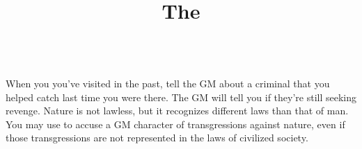 \documentclass[darkmode]{dw_playbook}
\title{The \playbook}
\begin{document}
\pageOne
    {
    }
    {
        \looks

        \vspace{1mm}
        \race\\
            {When you  you've visited in the past, tell the GM about a criminal that you helped catch last time you were there.  The GM will tell you if they're still seeking revenge.}
            {Nature is not lawless, but it recognizes different laws than that of man.  You may use  to accuse a GM character of transgressions against nature, even if those transgressions are not represented in the laws of civilized society.}
    }
\end{document}
